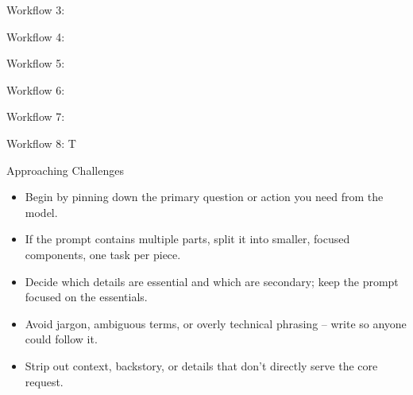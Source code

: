 \documentclass[aspectratio=169,10pt]{beamer}
\begin{document}
\begin{frame}{Workflow 3: }
  \vfill
  \centering
  \vfill
\end{frame}

\begin{frame}{Workflow 4: }
  \vfill
  \centering
  \vfill
\end{frame}

\begin{frame}{Workflow 5: }
  \vfill
  \centering
  \vfill
\end{frame}

\begin{frame}{Workflow 6: }
  \vfill
  \centering
  \vfill
\end{frame}

\begin{frame}{Workflow 7: }
  \vfill
  \centering
  \vfill
\end{frame}

\begin{frame}{Workflow 8: T}
  \vfill
  \centering
  \vfill
\end{frame}


\begin{frame}{Approaching Challenges}
  \small
  \begin{itemize}\itemsep8pt
    \item \small {} Begin by pinning down the primary
      question or action you need from the model.
    \item \small {} If the prompt contains multiple parts, split it
      into smaller, focused components, one task per piece.
    \item \small {} Decide which details are essential
      and which are secondary; keep the prompt focused on the essentials.
    \item \small {} Avoid jargon, ambiguous terms, or overly
      technical phrasing -- write so anyone could follow it.
    \item \small {} Strip out context, backstory,
      or details that don't directly serve the core request.
  \end{itemize}
\end{frame}
\end{document}
